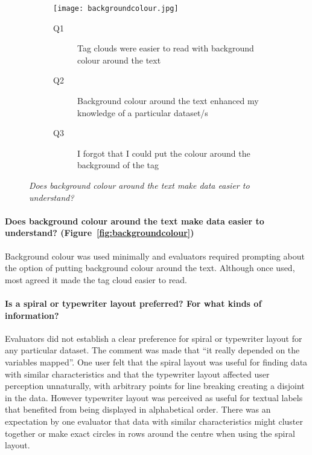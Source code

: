 \begin{figure}[!htb]
\centering
\begin{subfigure}{.5\textwidth}
	\centering
	\texttt{[image: backgroundcolour.jpg]}
\end{subfigure}%
\begin{subfigure}{.5\textwidth}
  \begin{description}
	\item[Q1]Tag clouds were easier to read with background colour around the text
	\item[Q2]Background colour around the text enhanced my knowledge of a particular dataset/s
	\item[Q3]I forgot that I could put the colour around the background of the tag 
  \end{description}
\end{subfigure}
\caption{\textit{Does background colour around the text make data easier to understand?}}
\label{fig:backgroundcolour}
\end{figure}

\paragraph{Does background colour around the text make data easier to understand? (Figure~\vref{fig:backgroundcolour})}

Background colour was used minimally and evaluators required prompting about the option of putting background colour around the text. Although once used, most agreed it made the tag cloud easier to read.

\paragraph{Is a spiral or typewriter layout preferred? For what kinds of information?}

Evaluators did not establish a clear preference for spiral or typewriter layout for any particular dataset. The comment was made that ``it really depended on the variables mapped''. One user felt that the spiral layout was useful for finding data with similar characteristics and that the typewriter layout affected user perception unnaturally, with arbitrary points for line breaking creating a disjoint in the data. However typewriter layout was perceived as useful for textual labels that benefited from being displayed in alphabetical order. There was an expectation by one evaluator that data with similar characteristics might cluster together or make exact circles in rows around the centre when using the spiral layout.

